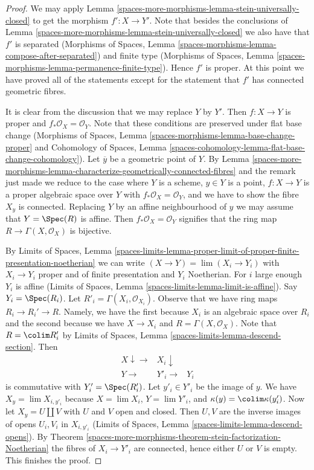 \begin{proof}
We may apply Lemma \ref{spaces-more-morphisms-lemma-stein-universally-closed} to get the
morphism $f' : X \to Y'$.
Note that besides the
conclusions of Lemma \ref{spaces-more-morphisms-lemma-stein-universally-closed} we
also have that $f'$ is separated
(Morphisms of Spaces, Lemma
\ref{spaces-morphisms-lemma-compose-after-separated})
and finite type
(Morphisms of Spaces, Lemma
\ref{spaces-morphisms-lemma-permanence-finite-type}).
Hence $f'$ is proper. At this point we have proved all of the
statements except for the statement
that $f'$ has connected geometric fibres.

\medskip\noindent
It is clear from the discussion that we may replace $Y$ by $Y'$.
Then $f : X \to Y$ is proper and $f_*\mathcal{O}_X = \mathcal{O}_Y$.
Note that these conditions are preserved under flat base change
(Morphisms of Spaces, Lemma \ref{spaces-morphisms-lemma-base-change-proper}
and
Cohomology of Spaces, Lemma
\ref{spaces-cohomology-lemma-flat-base-change-cohomology}).
Let $\overline{y}$ be a geometric point of $Y$. By
Lemma \ref{spaces-more-morphisms-lemma-characterize-geometrically-connected-fibres}
and the remark just made we reduce to the case where $Y$ is a
scheme, $y \in Y$ is a point, $f : X \to Y$ is a proper algebraic
space over $Y$ with $f_*\mathcal{O}_X = \mathcal{O}_Y$,
and we have to show the fibre $X_y$ is connected.
Replacing $Y$ by an affine neighbourhood of $y$ we may
assume that $Y = \Spec(R)$ is affine. Then $f_*\mathcal{O}_X = \mathcal{O}_Y$
signifies that the ring map
$R \to \Gamma(X, \mathcal{O}_X)$ is bijective.

\medskip\noindent
By Limits of Spaces, Lemma
\ref{spaces-limits-lemma-proper-limit-of-proper-finite-presentation-noetherian}
we can write $(X \to Y) = \lim (X_i \to Y_i)$ with $X_i \to Y_i$
proper and of finite presentation and $Y_i$ Noetherian. For $i$ large
enough $Y_i$ is affine (Limits of Spaces, Lemma
\ref{spaces-limits-lemma-limit-is-affine}).
Say $Y_i = \Spec(R_i)$. Let $R'_i = \Gamma(X_i, \mathcal{O}_{X_i})$.
Observe that we have ring maps $R_i \to R_i' \to R$. Namely, we have
the first because $X_i$ is an algebraic space over $R_i$ and the second because
we have $X \to X_i$ and $R = \Gamma(X, \mathcal{O}_X)$. Note that
$R = \colim R'_i$ by Limits of Spaces, Lemma
\ref{spaces-limits-lemma-descend-section}.
Then
$$
\begin{array}{ccc}X \downarrow\longrightarrow & X_i \downarrow &  \\ Y \longrightarrow & Y'_i \longrightarrow & Y_i\end{array}
$$
is commutative with $Y'_i = \Spec(R'_i)$.
Let $y'_i \in Y'_i$ be the image of $y$.
We have $X_y = \lim X_{i, y'_i}$ because $X = \lim X_i$,
$Y = \lim Y'_i$, and $\kappa(y) = \colim \kappa(y'_i)$.
Now let $X_y = U \amalg V$ with $U$ and $V$ open and closed.
Then $U, V$ are the inverse images of opens $U_i, V_i$ in $X_{i, y'_i}$
(Limits of Spaces, Lemma \ref{spaces-limits-lemma-descend-opens}).
By Theorem \ref{spaces-more-morphisms-theorem-stein-factorization-Noetherian} the fibres
of $X_i \to Y'_i$ are connected, hence either $U$ or $V$ is empty.
This finishes the proof.
\end{proof}

